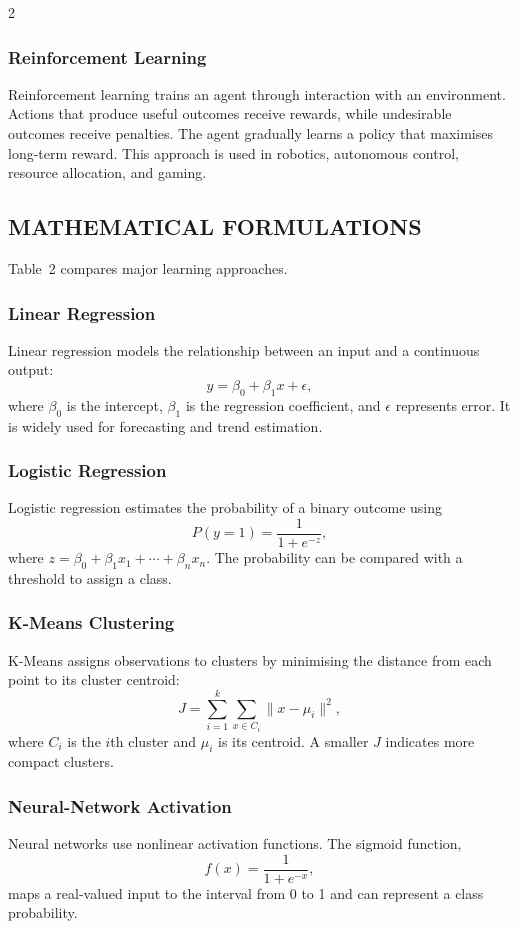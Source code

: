 \begin{multicols}{2}
  \subsubsection*{Reinforcement Learning}
  Reinforcement learning trains an agent through interaction with an environment. Actions that produce useful outcomes receive rewards, while undesirable outcomes receive penalties. The agent gradually learns a policy that maximises long-term reward. This approach is used in robotics, autonomous control, resource allocation, and gaming.

  \subsection*{\centering\uppercase{Mathematical Formulations}}
  Table~2 compares major learning approaches.
  \subsubsection*{Linear Regression}
  Linear regression models the relationship between an input and a continuous output:
  \[
    y = \beta_0 + \beta_1x + \epsilon,
  \]
  where $\beta_0$ is the intercept, $\beta_1$ is the regression coefficient, and $\epsilon$ represents error. It is widely used for forecasting and trend estimation.

  \subsubsection*{Logistic Regression}
  Logistic regression estimates the probability of a binary outcome using
  \[
    P(y=1)=\frac{1}{1+e^{-z}},
  \]
  where $z=\beta_0+\beta_1x_1+\cdots+\beta_nx_n$. The probability can be compared with a threshold to assign a class.

  \subsubsection*{K-Means Clustering}
  K-Means assigns observations to clusters by minimising the distance from each point to its cluster centroid:
  \[
    J=\sum_{i=1}^{k}\sum_{x\in C_i}\lVert x-\mu_i\rVert^2,
  \]
  where $C_i$ is the $i$th cluster and $\mu_i$ is its centroid. A smaller $J$ indicates more compact clusters.

  \subsubsection*{Neural-Network Activation}
  Neural networks use nonlinear activation functions. The sigmoid function,
  \[
    f(x)=\frac{1}{1+e^{-x}},
  \]
  maps a real-valued input to the interval from 0 to 1 and can represent a class probability.


\end{multicols}
